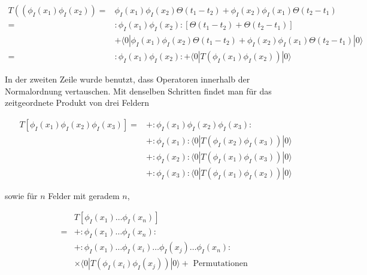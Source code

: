 \documentclass[10pt, letterpaper]{article}
\begin{document}
$$
\begin{aligned}
T\left(\left(\phi_{I}\left(x_{1}\right) \phi_{I}\left(x_{2}\right)\right)=\right. & \phi_{I}\left(x_{1}\right) \phi_{I}\left(x_{2}\right) \Theta\left(t_{1}-t_{2}\right)+\phi_{I}\left(x_{2}\right) \phi_{I}\left(x_{1}\right) \Theta\left(t_{2}-t_{1}\right) \\
= & : \phi_{I}\left(x_{1}\right) \phi_{I}\left(x_{2}\right):\left[\Theta\left(t_{1}-t_{2}\right)+\Theta\left(t_{2}-t_{1}\right)\right] \\
& +\langle 0| \phi_{I}\left(x_{1}\right) \phi_{I}\left(x_{2}\right) \Theta\left(t_{1}-t_{2}\right)+\phi_{I}\left(x_{2}\right) \phi_{I}\left(x_{1}\right) \Theta\left(t_{2}-t_{1}\right)|0\rangle \\
= & : \phi_{I}\left(x_{1}\right) \phi_{I}\left(x_{2}\right):+\langle 0| T\left(\phi_{I}\left(x_{1}\right) \phi_{I}\left(x_{2}\right)\right)|0\rangle
\end{aligned}
$$

In der zweiten Zeile wurde benutzt, dass Operatoren innerhalb der Normalordnung vertauschen. Mit denselben Schritten findet man für das zeitgeordnete Produkt von drei Feldern

$$
\begin{aligned}
T\left[\phi_{I}\left(x_{1}\right) \phi_{I}\left(x_{2}\right) \phi_{I}\left(x_{3}\right)\right]= & +: \phi_{I}\left(x_{1}\right) \phi_{I}\left(x_{2}\right) \phi_{I}\left(x_{3}\right): \\
& +: \phi_{I}\left(x_{1}\right):\langle 0| T\left(\phi_{I}\left(x_{2}\right) \phi_{I}\left(x_{3}\right)\right)|0\rangle \\
& +: \phi_{I}\left(x_{2}\right):\langle 0| T\left(\phi_{I}\left(x_{1}\right) \phi_{I}\left(x_{3}\right)\right)|0\rangle \\
& +: \phi_{I}\left(x_{3}\right):\langle 0| T\left(\phi_{I}\left(x_{1}\right) \phi_{I}\left(x_{2}\right)\right)|0\rangle
\end{aligned}
$$

sowie für $n$ Felder mit geradem $n$,

$$
\begin{aligned}
& T\left[\phi_{I}\left(x_{1}\right) \ldots \phi_{I}\left(x_{n}\right)\right] \\
= & +: \phi_{I}\left(x_{1}\right) \ldots \phi_{I}\left(x_{n}\right): \\
& +: \phi_{I}\left(x_{1}\right) \ldots \phi_{I}\left(x_{i}\right) \ldots \phi_{I}\left(x_{j}\right) \ldots \phi_{I}\left(x_{n}\right): \\
& \times\langle 0| T\left(\phi_{I}\left(x_{i}\right) \phi_{I}\left(x_{j}\right)\right)|0\rangle+\text { Permutationen }
\end{aligned}
$$
\end{document}
